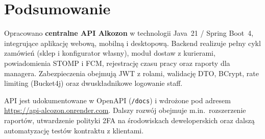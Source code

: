 \documentclass[12pt,a4paper]{report}
\newcommand{\blok}[1]{\needspace{9\baselineskip}#1}
\begin{document}
\chapter{Podsumowanie}

\blok{%
Opracowano \textbf{centralne API Alkozon} w technologii Java~21 / Spring Boot~4, integrujące aplikację webową, mobilną i desktopową. Backend realizuje pełny cykl zamówień (sklep i konfigurator własny), moduł dostaw z kurierami, powiadomienia STOMP i FCM, rejestrację czasu pracy oraz raporty dla managera. Zabezpieczenia obejmują JWT z rolami, walidację DTO, BCrypt, rate limiting (Bucket4j) oraz dwuskładnikowe logowanie staff.

API jest udokumentowane w OpenAPI (\texttt{/docs}) i wdrożone pod adresem \url{https://api-alcozon.onrender.com}. Dalszy rozwój obejmuje m.in.\ rozszerzenie raportów, utwardzenie polityki 2FA na środowiskach deweloperskich oraz dalszą automatyzację testów kontraktu z klientami.
}
\end{document}
